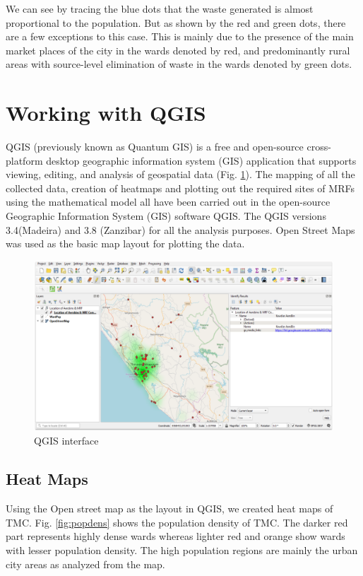 \documentclass[12pt,a4paper]{report}
\begin{document}
We can see by tracing the blue dots that the waste generated is almost proportional to the population. But as shown by the red and green dots, there are a few exceptions to this case. This is mainly due to the presence of the main market places of the city in the wards denoted by red, and predominantly rural areas with source-level elimination of waste in the wards denoted by green dots.

\section{Working with QGIS}
QGIS (previously known as Quantum GIS) is a free and open-source cross-platform desktop geographic information system (GIS) application that supports viewing, editing, and analysis of geospatial data (Fig. \ref{fig:qgisui}). The mapping of all the collected data, creation of heatmaps and plotting out the required sites of MRFs using the mathematical model all have been carried out in the open-source Geographic Information System (GIS)  software QGIS. The QGIS versions 3.4(Madeira) and 3.8 (Zanzibar) for all the analysis purposes. Open Street Maps was used as the basic map layout for plotting the data. 

\begin{figure}[H]
	\centering
	\includegraphics[width=1\linewidth]{qgis_ui}
	\caption{QGIS interface}
	\label{fig:qgisui}
\end{figure}

\subsection{Heat Maps}
Using the Open street map as the layout in QGIS, we created heat maps of TMC. Fig. \ref{fig:popdens} shows the population density of TMC. The darker red part represents highly dense wards whereas lighter red and orange show wards with lesser population density. The high population regions are mainly the urban city areas as analyzed from the map. 
\end{document}
